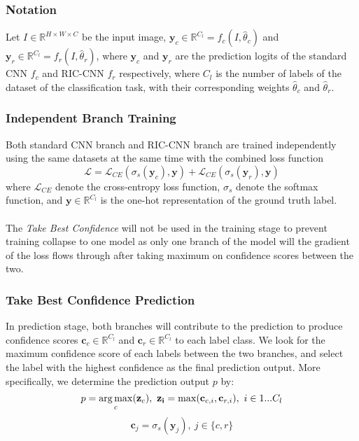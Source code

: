 \subsubsection{Notation}
Let $I \in \mathbb{R}^{H \times W \times C}$ be the input image, $\mathbf{y}_c \in \mathbb{R}^{C_l} = f_c(I, \hat{\theta}_c)$ and $\mathbf{y}_r \in \mathbb{R}^{C_l} = f_r(I, \hat{\theta}_r)$, where $\mathbf{y}_c$ and $\mathbf{y}_r$ are the prediction logits of the standard CNN $f_c$ and RIC-CNN $f_r$ respectively, where $C_l$ is the number of labels of the dataset of the classification task, with their corresponding weights $\hat{\theta}_c$ and $\hat{\theta}_r$.

\subsubsection{Independent Branch Training}
Both standard CNN branch and RIC-CNN branch are trained independently using the same datasets at the same time with the combined loss function
$$
\mathcal{L} = \mathcal{L}_{CE}(\sigma_s(\mathbf{y}_c), \mathbf{y}) + \mathcal{L}_{CE}(\sigma_s(\mathbf{y}_r), \mathbf{y})
$$
where $\mathcal{L}_{CE}$ denote the cross-entropy loss function, $\sigma_s$ denote the softmax function, and $\mathbf{y} \in \mathbb{R}^{C_l}$ is the one-hot representation of the ground truth label.
\\ \\
The \textit{Take Best Confidence} will not be used in the training stage to prevent training collapse to one model as only one branch of the model will the gradient of the loss flows through after taking maximum on confidence scores between the two.

\subsubsection{Take Best Confidence Prediction}
In prediction stage, both branches will contribute to the prediction to produce confidence scores $\mathbf{c}_c \in \mathbb{R}^{C_l}$ and $\mathbf{c}_r \in \mathbb{R}^{C_l}$ to each label class. We look for the maximum confidence score of each labels between the two branches, and select the label with the highest confidence as the final prediction output.
More specifically, we determine the prediction output $p$ by:
$$
p = \argmax_c(\mathbf{z}_c),\ \mathbf{z_i} = \max(\mathbf{c}_{c,i}, \mathbf{c}_{r,i}),\ i \in 1...C_l
$$
$$
\mathbf{c}_j = \sigma_s(\mathbf{y}_j),\ j \in \{c, r\}
$$
